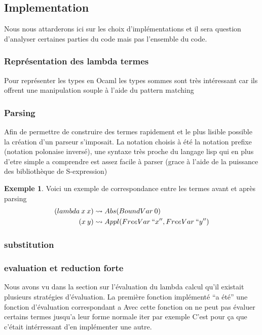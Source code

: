 \documentclass {article}
\theoremstyle{definition}
\newtheorem{example}{Exemple}
\theoremstyle{remark}
\begin{document}
\subsection{Implementation}

Nous nous attarderons ici sur les choix d'implémentations et il sera question
d'analyser certaines parties du code mais pas l'ensemble du code.

\subsubsection{Représentation des lambda termes}
Pour représenter les types en Ocaml les types sommes sont très intéressant car 
ils offrent une manipulation souple à l'aide du pattern matching



\subsubsection{Parsing}
Afin de permettre de construire des termes rapidement et le plus lisible 
possible la création d'un parseur s'imposait.
La notation choisis à été la notation prefixe (notation polonaise inversé),
une syntaxe très proche du langage lisp qui en plus d'etre simple a comprendre
est assez facile à parser (grace à l'aide de la puissance des bibliothèque
de S-expression)
\begin{example}
  Voici un exemple de correspondance entre les termes avant et après parsing
  \begin{align*}
    (lambda\: x \: x) & \leadsto Abs(BoundVar\: 0) \\
    (x\: y) & \leadsto Appl(FreeVar\: ``x'',FreeVar\: ``y'')       
  \end{align*}
\end{example}



\subsubsection{substitution}

\subsubsection{evaluation et reduction forte}
Nous avons vu dans la section sur l'évaluation du lambda calcul qu'il existait
plusieurs stratégies d'évaluation. 
La première fonction implémenté ``a été'' une fonction d'évaluation 
correspondant a %
Avec cette fonction on ne peut pas évaluer certains termes jusqu'a 
leur forme normale iter par exemple
C'est pour ça que c'était intérressant d'en implémenter une autre.
\end{document}
